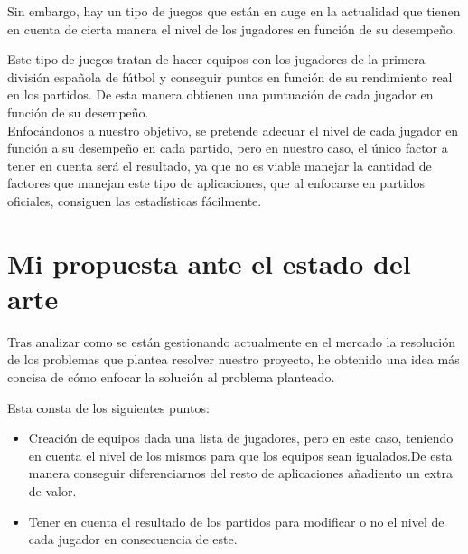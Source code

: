 Sin embargo, hay un tipo de juegos que están en auge en la actualidad que tienen en cuenta de cierta manera el nivel de los
jugadores en función de su desempeño.

Este tipo de juegos tratan de hacer equipos con los jugadores de la primera división española de fútbol y conseguir puntos en función
de su rendimiento real en los partidos. De esta manera obtienen una puntuación de cada jugador en función de su desempeño.\\

Enfocándonos a nuestro objetivo, se pretende adecuar el nivel de cada jugador en función a su desempeño en cada partido, pero en nuestro caso,
el único factor a tener en cuenta será el resultado, ya que no es viable manejar la cantidad de factores que manejan este tipo de aplicaciones,
que al enfocarse en partidos oficiales, consiguen las estadísticas fácilmente.

\section{Mi propuesta ante el estado del arte}

Tras analizar como se están gestionando actualmente en el mercado la resolución de los problemas que plantea resolver nuestro proyecto, he obtenido
una idea más concisa de cómo enfocar la solución al problema planteado.

Esta consta de los siguientes puntos:

\begin{itemize}
    \item Creación de equipos dada una lista de jugadores, pero en este caso, teniendo en cuenta el nivel de los mismos para que los equipos sean igualados.De esta manera conseguir diferenciarnos
    del resto de aplicaciones añadiento un extra de valor.
    \item Tener en cuenta el resultado de los partidos para modificar o no el nivel de cada jugador en consecuencia de este.
\end{itemize}
